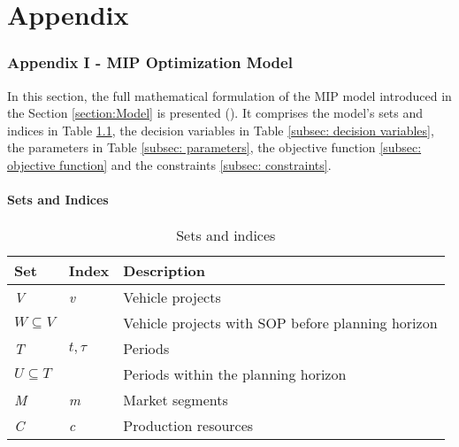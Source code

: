 \part*{Appendix}
\renewcommand{\thesection}{\arabic{section}}
\renewcommand{\theequation}{\arabic{equation}}
\section{Appendix I - MIP Optimization Model}\label{section:Appendix One - Full Model Formulation}
\renewcommand{\thetable}{A\arabic{table}} %
\renewcommand{\theequation}{A. \arabic{equation}} %
In this section, the full mathematical formulation of the MIP model introduced in the Section \ref{section:Model} is presented (\cite{mainreference_thies}). It comprises the model's sets and indices in Table \ref{subsec: sets and indices}, the decision variables in Table \ref{subsec: decision variables}, the parameters in Table \ref{subsec: parameters}, the objective function \ref{subsec: objective function} and the constraints \ref{subsec: constraints}.
\subsection{Sets and Indices}\label{subsec: sets and indices}
\begin{table}[h]
\centering
\begin{tabular}{llp{10cm}}
\toprule
Set & Index & Description \\
\midrule
\textit{V} & \textit{v} & Vehicle projects\\[0.5em]
$W \subseteq V$ & & Vehicle projects with \gls{SOP} before planning horizon \\[0.5em]
\textit{T} & $t, \tau$ & Periods\\[0.5em]
$U \subseteq T$ & & Periods within the planning horizon \\[0.5em]
\textit{M} & \textit{m} & Market segments\\[0.5em]
\textit{C} & \textit{c} & Production resources\\[0.5em]
\bottomrule
\end{tabular}
\caption{Sets and indices}\label{tab:sets and indices}
\end{table}

